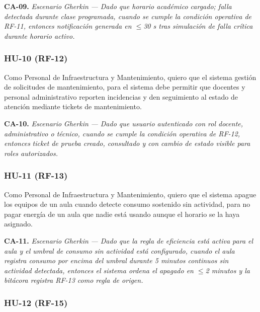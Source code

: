 \textbf{CA-09.} \textit{Escenario }\textit{Gherkin}\textit{ --- Dado que horario académico cargado; falla detectada durante clase programada, cuando se cumple la condición operativa de RF-11, entonces notificación generada en $\leq$30 s tras simulación de falla crítica durante horario activo.}


\subsubsection*{HU-10 (RF-12)}


Como Personal de Infraestructura y Mantenimiento, quiero que el sistema gestión de solicitudes de mantenimiento, para el sistema debe permitir que docentes y personal administrativo reporten incidencias y den seguimiento al estado de atención mediante tickets de mantenimiento.


\textbf{CA-10.} \textit{Escenario }\textit{Gherkin}\textit{ --- Dado que usuario autenticado con rol docente, administrativo o técnico, cuando se cumple la condición operativa de RF-12, entonces }\textit{ticket}\textit{ de prueba creado, consultado y con cambio de estado visible para roles autorizados.}


\subsubsection*{HU-11 (RF-13)}


Como Personal de Infraestructura y Mantenimiento, quiero que el sistema apague los equipos de un aula cuando detecte consumo sostenido sin actividad, para no pagar energía de un aula que nadie está usando aunque el horario se la haya asignado.


\textbf{CA-11.} \textit{Escenario }\textit{Gherkin}\textit{ --- Dado que la regla de eficiencia está activa para el aula y el umbral de consumo sin actividad está configurado, cuando el aula registra consumo por encima del umbral durante 5 minutos continuos sin actividad detectada, entonces el sistema ordena el apagado en $\leq$2 minutos y la bitácora registra RF-13 como regla de origen.}


\subsubsection*{HU-12 (RF-15)}

